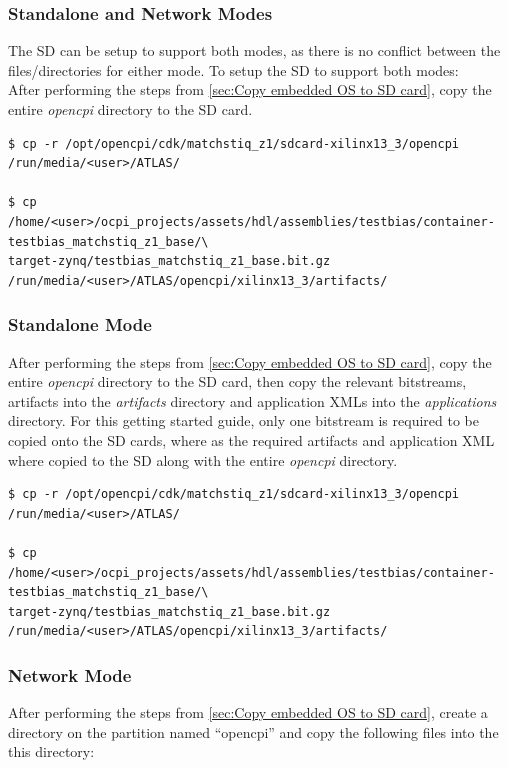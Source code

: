 \subsubsection{Standalone and Network Modes}
The SD can be setup to support both modes, as there is no conflict between the files/directories for either mode. To setup the SD to support both modes:\\

\noindent After performing the steps from \ref{sec:Copy embedded OS to SD card}, copy the entire \textit{opencpi} directory to the SD card.

\begin{verbatim}
$ cp -r /opt/opencpi/cdk/matchstiq_z1/sdcard-xilinx13_3/opencpi /run/media/<user>/ATLAS/

$ cp /home/<user>/ocpi_projects/assets/hdl/assemblies/testbias/container-testbias_matchstiq_z1_base/\
target-zynq/testbias_matchstiq_z1_base.bit.gz /run/media/<user>/ATLAS/opencpi/xilinx13_3/artifacts/
\end{verbatim}

\subsubsection{Standalone Mode}
After performing the steps from \ref{sec:Copy embedded OS to SD card}, copy the entire \textit{opencpi} directory to the SD card, then copy the relevant bitstreams, artifacts into the \textit{artifacts} directory and application XMLs into the \textit{applications} directory. For this getting started guide, only one bitstream is required to be copied onto the SD cards, where as the required artifacts and application XML where copied to the SD along with the entire \textit{opencpi} directory.

\begin{verbatim}
$ cp -r /opt/opencpi/cdk/matchstiq_z1/sdcard-xilinx13_3/opencpi /run/media/<user>/ATLAS/

$ cp /home/<user>/ocpi_projects/assets/hdl/assemblies/testbias/container-testbias_matchstiq_z1_base/\
target-zynq/testbias_matchstiq_z1_base.bit.gz /run/media/<user>/ATLAS/opencpi/xilinx13_3/artifacts/
\end{verbatim}

\subsubsection{Network Mode}
After performing the steps from \ref{sec:Copy embedded OS to SD card}, create a directory on the partition named ``opencpi'' and copy the following files into the this directory:

